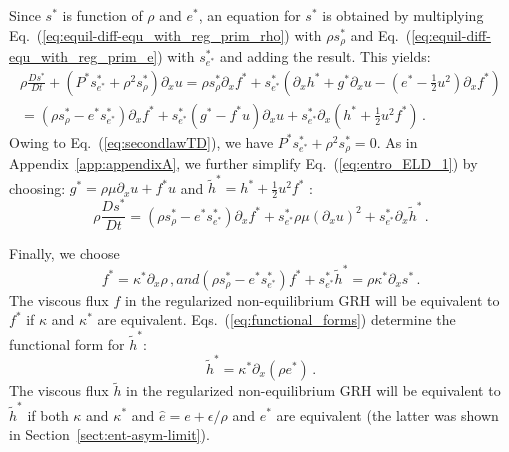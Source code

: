 \documentclass[review]{elsarticle}
\newcommand{\eqt}[1]{Eq.~(\ref{#1})}                     %
\newcommand{\eqts}[1]{Eqs.~(\ref{#1})}                     %
\newcommand{\sect}[1]{Section~\ref{#1}}                     %
\newcommand{\app}[1]{Appendix~\ref{#1}}                     %
\newcommand{\tcr}[1]{\textcolor{red}{#1}}
\newcommand{\matder}[1]{\frac{D #1}{Dt}}
\begin{document}
\begin{appendices}
Since $s^*$ is function of $\rho$ and $e^*$, an equation for $s^*$  is obtained by multiplying 
\eqt{eq:equil-diff-equ_with_reg_prim_rho} with $\rho s^*_\rho$  and 
\eqt{eq:equil-diff-equ_with_reg_prim_e}   with $s^*_{e^*}$ and adding the result. This yields:
\begin{multline} \label{eq:entro_ELD_1}
\rho \matder {s^*}  +  \left( P^* s^*_{e^*} + \rho^2 s^*_{\rho} \right) \partial_x u  = 
 \rho s^*_\rho \partial_x f^*
+ s^*_{e^*} \left(  \partial_x h^* + g^* \partial_x u - \left( e^* - \tfrac 1 2 u^2 \right) \partial_x  f^* \right) 
\\
=
\left( \rho s^*_\rho  - e^* s^*_{e^*}\right) \partial_x f^*
+ s^*_{e^*} \left(  g^* - f^* u \right) \partial_x u 
+ s^*_{e^*} \partial_x \left( h^* +  \tfrac 1 2 u^2  f^* \right) 
\, . 
\end{multline}
%
Owing to \eqt{eq:secondlawTD},  we have $ P^* s^*_{e^*} + \rho^2 s^*_{\rho}  = 0$. As in \app{app:appendixA}, we further 
simplify \eqt{eq:entro_ELD_1} by choosing: $ g^* = \rho \mu \partial_x u + f^* u$ and $\tilde h^* = h^* + \tfrac 1 2 u^2 f^*$ :
%
\begin{equation} \label{eq:entro_EDL_2}
\rho \matder {s^*}  
=
\left( \rho s^*_\rho  - e^* s^*_{e^*}\right) \partial_x f^*
+ s^*_{e^*} \rho \mu \left( \partial_x u \right)^2
+ s^*_{e^*} \partial_x \tilde h^* 
\, . 
\end{equation}

Finally, we choose 
\begin{subequations} \label{eq:functional_forms}
\begin{equation} 
f^* = \kappa^* \partial_x \rho \,,
\end{equation}
and 
\begin{equation} 
\left( \rho s^*_\rho - e^* s^*_{e^*}  \right)  f^* + s^*_{e^*} \tilde h^* = \rho  \kappa^* \partial_x s^* \,.
\end{equation}
\end{subequations}
%
The viscous flux $f$ in the regularized non-equilibrium GRH will be equivalent to $f^*$ if $\kappa$ and $\kappa^*$ are equivalent.
\eqts{eq:functional_forms} determine the functional form for $\tilde h^*$:
\begin{equation} 
\tilde h^* = \kappa^* \partial_x (\rho e^*) \, .
\end{equation}
The viscous flux $\tilde h$ in the regularized non-equilibrium GRH will be equivalent to $\tilde h^*$ if both $\kappa$ and $\kappa^*$ and $\hat e = e+\epsilon/\rho$ and $e^*$ are equivalent (the latter was shown in \sect{sect:ent-asym-limit}). %


\end{appendices}
\end{document}
